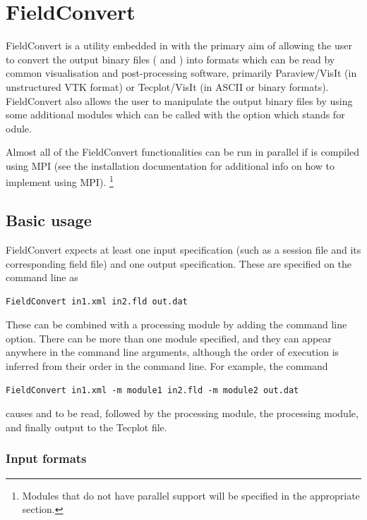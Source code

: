 \chapter{FieldConvert}
\label{s:utilities:fieldconvert}
FieldConvert is a utility embedded in \nekpp with the primary aim of allowing
the user to convert the \nekpp output binary files ( and
) into formats which can be read by common visualisation and
post-processing software, primarily Paraview/VisIt (in unstructured VTK
 format) or Tecplot/VisIt (in ASCII  or binary
 formats). FieldConvert also allows the user to manipulate the
\nekpp output binary files by using some additional modules which can be called
with the option  which stands for odule.

Almost all of the FieldConvert functionalities can be run in parallel if \nekpp
is compiled using MPI (see the installation documentation for additional info on
how to implement \nekpp using MPI). \footnote{Modules that do not have parallel
  support will be specified in the appropriate section.}
%
%
%
\section{Basic usage}
FieldConvert expects at least one input specification (such as a session file
and its corresponding field file) and one output specification. These are
specified on the command line as
%
\begin{lstlisting}[style=BashInputStyle]
  FieldConvert in1.xml in2.fld out.dat
\end{lstlisting}
%
These can be combined with a processing module by adding the  command
line option. There can be more than one module specified, and they can appear
anywhere in the command line arguments, although the order of execution is
inferred from their order in the command line. For example, the command
%
\begin{lstlisting}[style=BashInputStyle]
  FieldConvert in1.xml -m module1 in2.fld -m module2 out.dat
\end{lstlisting}
%
causes  and  to be read, followed by the
 processing module, the  processing module, and
finally output to the  Tecplot file.

\subsection{Input formats}

